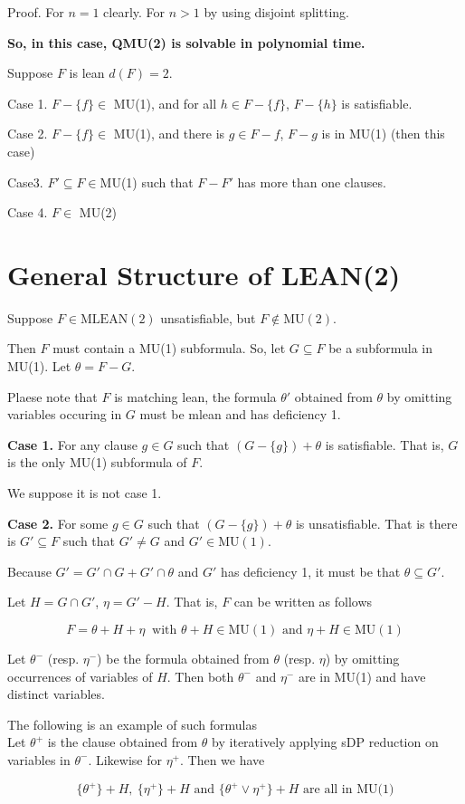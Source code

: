 \documentclass[12pt]{article}
\begin{document}
\begin{CJK*}{GBK}{song}
Proof. For $n=1$ clearly. For $n>1$ by using disjoint splitting. 


{\bf So, in this case, QMU(2) is solvable in polynomial time.}


Suppose $F$ is lean $d(F)=2$. 

Case 1. $F-\{f\}\in$ MU(1), and for all $h\in F-\{f\}$, $F-\{h\}$ is satisfiable.

Case 2. $F-\{f\}\in$ MU(1), and there is $g\in F-f$, $F-g$ is in MU(1) (then this case)

Case3. $F'\subseteq F\in $MU(1) such that $F-F'$ has more than one clauses. 

Case 4. $F\in$ MU(2)



\section{General Structure of LEAN(2)}

Suppose $F\in\text{MLEAN}(2)$ unsatisfiable, but $F\not\in \text{MU}(2)$. 

Then $F$ must contain a MU(1) subformula. So, let $G\subseteq F$ be a subformula in MU(1). Let $\theta=F-G$. 

Plaese note that $F$ is matching lean, the formula $\theta'$ obtained from $\theta$ by omitting variables occuring in $G$ must be mlean and has deficiency 1.  

{\bf Case 1.} For any clause $g\in G$  such that $(G-\{g\})+\theta$ is satisfiable. That is, $G$ is the only MU(1) subformula of $F$. 

We suppose it is not case 1. 

   
{\bf Case 2.} For some $g\in G$ such that $(G-\{g\})+\theta$ is unsatisfiable.
That is there is $G'\subseteq F$ such that $G'\not=G$ and $G'\in \text{MU}(1)$. 

Because $G'=G'\cap G+G'\cap \theta$ and $G'$ has deficiency 1, it must be that $\theta\subseteq G'$. 

Let $H=G\cap G'$, $\eta =G'-H$. That is, $F$ can be written as follows

$$F=\theta+H+\eta\ \text{ with }\theta+H\in \text{MU}(1) \text{ and } \eta+H \in \text{MU}(1)$$ 

Let $\theta^-$ (resp. $\eta^-$) be the formula obtained from $\theta$ (resp. $\eta$) by omitting occurrences of variables of $H$. Then both $\theta^-$ and $\eta^-$ are in MU(1) and have distinct variables. 

The following is an example of such formulas \\


Let $\theta^+$ is the clause obtained from $\theta$ by iteratively applying sDP reduction on variables in $\theta^-$. Likewise for $\eta^+$. Then we have 

$$\{\theta^+\}+H,\ \{\eta^+\}+H \text{ and } \{\theta^+\vee \eta^+\}+H \text{ are all in MU(1)}$$ 





\end{CJK*}
\end{document}
